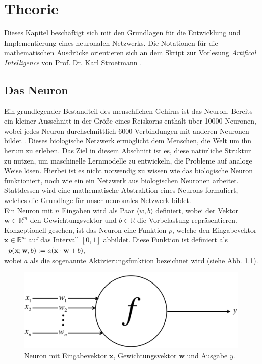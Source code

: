 \chapter{Theorie}
Dieses Kapitel beschäftigt sich mit den Grundlagen für die Entwicklung und Implementierung eines neuronalen Netzwerks. Die Notationen für die mathematischen Ausdrücke orientieren sich an dem Skript zur Vorlesung \textit{Artifical Intelligence} von Prof. Dr. Karl Stroetmann \cite{stroetmann:2017}.

\section{Das Neuron}
\label{chap:sigmoid}
Ein grundlegender Bestandteil des menschlichen Gehirns ist das Neuron. Bereits ein kleiner Ausschnitt in der Größe eines Reiskorns enthält über 10000 Neuronen, wobei jedes Neuron durchschnittlich 6000 Verbindungen mit anderen Neuronen bildet \cite{buduma:2017}. Dieses biologische Netzwerk ermöglicht dem Menschen, die Welt um ihn herum zu erleben. Das Ziel in diesem Abschnitt ist es, diese natürliche Struktur zu nutzen, um maschinelle Lernmodelle zu entwickeln, die Probleme auf analoge Weise lösen. Hierbei ist es nicht notwendig zu wissen wie das biologische Neuron funktioniert, noch wie ein ein Netzwerk aus biologischen Neuronen arbeitet. Stattdessen wird eine mathematische Abstraktion eines Neurons formuliert, welches die Grundlage für unser neuronales Netzwerk bildet. \\
Ein Neuron mit $n$ Eingaben wird als Paar $\langle w,b \rangle$ definiert, wobei der Vektor $\mathbf{w} \in \mathbb{R}^m$ den Gewichtungsvektor und $b \in \mathbb{R}$ die Vorbelastung repräsentieren. Konzeptionell gesehen, ist das Neuron eine Funktion $p$, welche den Eingabevektor $\mathbf{x} \in \mathbb{R}^m$ auf das Intervall $[0,1]$ abbildet. Diese Funktion ist definiert als \\[0.2cm]
\hspace*{1.3cm}
$
\begin{array}[t]{lclll}
	p(\mathbf{x};\mathbf{w},b) := a(\mathbf{x}\cdot\mathbf{w}+b),
\end{array}
$
\\[0.2cm]
wobei $a$ als die sogenannte Aktivierungsfunktion bezeichnet wird (siehe Abb. \ref{fig:perceptron}).
\begin{figure}[hbt]
	\centering
	\includegraphics[scale=0.25]{Bilder/sigmoid_neuron}
	\caption{Neuron mit Eingabevektor $\mathbf{x}$, Gewichtungsvektor $\mathbf{w}$ und Ausgabe $y$. \cite{buduma:2017}} 
	\label{fig:perceptron} 
\end{figure}

